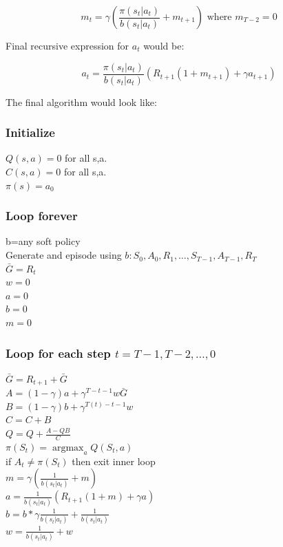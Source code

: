 \documentclass[11pt]{article}
\DeclareMathOperator*{\argmax}{argmax}
\begin{document}
    \begin{equation}
        m_{t} = \gamma  (\frac{\pi(s_{t}|a_{t})}{b(s_{t}|a_{t})} + m_{t+1})  \text{ where $m_{T-2} = 0$}
    \end{equation}

    Final recursive expression for $a_t$ would be:

    \begin{equation}
        a_{t} = \frac{\pi(s_{t}|a_{t})}{b(s_{t}|a_{t})} ( R_{t+1} (1 + m_{t+1}) + \gamma a_{t+1})
    \end{equation}

    The final algorithm would look like:

    \subsubsection*{Initialize}

    $Q(s,a) = 0$ for all s,a. \\
    $C(s,a) = 0$ for all s,a. \\
    $ \pi(s) =a_0 $

    \subsubsection*{Loop forever}
    b=any soft policy \\
    Generate and episode using $ b: S_0 , A_0 , R_1 , \dots , S_{T-1} , A_{T-1} , R_{T} $ \\
    $ \bar{G} = R_t $ \\
    $ w = 0 $ \\
    $ a = 0 $ \\
    $ b = 0 $ \\
    $ m = 0 $

    \subsubsection*{Loop for each step $t = T-1, T-2, \dots , 0$}

    $\bar{G} = R_{t+1} + \bar{G} $ \\
    $ A =  (1-\gamma) a + \gamma^{T-t-1} w \bar{G} $ \\
    $ B =  (1-\gamma) b + \gamma^{T(t)-t-1} w  $ \\
    $ C = C + B $ \\
    $ Q = Q + \frac{A - Q B }{C} $ \\
    $ \pi(S_t) = \argmax_a Q(S_t , a) $ \\
    if $ A_t \neq \pi(S_t)$ then exit inner loop \\
    $ m = \gamma  (\frac{1}{b(s_{t}|a_{t})} + m ) $ \\
    $ a = \frac{1}{b(s_t|a_t)} ( R_{t+1} (1 + m) + \gamma a) $ \\
    $ b = b * \gamma \frac{1}{b(s_{t}|a_{t})} + \frac{1}{b(s_{t}|a_{t})} $ \\
    $ w = \frac{1}{b(s_t|a_t)} + w $
\end{document}
